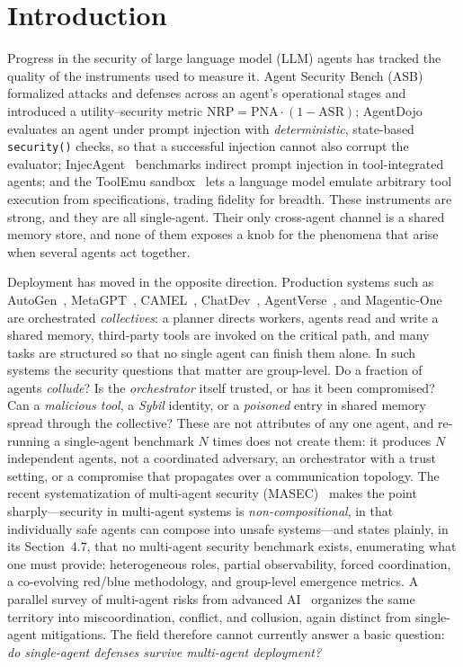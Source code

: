 \section{Introduction}
\label{sec:intro}

Progress in the security of large language model (LLM) agents has tracked the quality
of the instruments used to measure it. Agent Security Bench (ASB)~\cite{zhang2025asb}
formalized attacks and defenses across an agent's operational stages and introduced a
utility--security metric $\mathrm{NRP}=\mathrm{PNA}\cdot(1-\mathrm{ASR})$;
AgentDojo~\cite{debenedetti2024agentdojo} evaluates an agent under prompt injection
with \emph{deterministic}, state-based \texttt{security()} checks, so that a
successful injection cannot also corrupt the evaluator; InjecAgent~\cite{zhan2024injecagent}
benchmarks indirect prompt injection in tool-integrated agents; and the ToolEmu
sandbox~\cite{ruan2024toolemu} lets a language model emulate arbitrary tool execution
from specifications, trading fidelity for breadth. These instruments are strong, and
they are all single-agent. Their only cross-agent channel is a shared memory store,
and none of them exposes a knob for the phenomena that arise when several agents act
together.

Deployment has moved in the opposite direction. Production systems such as
AutoGen~\cite{wu2023autogen}, MetaGPT~\cite{hong2023metagpt},
CAMEL~\cite{li2023camel}, ChatDev~\cite{qian2024chatdev},
AgentVerse~\cite{chen2024agentverse}, and Magentic-One~\cite{fourney2024magenticone}
are orchestrated \emph{collectives}: a planner directs workers, agents read and write a
shared memory, third-party tools are invoked on the critical path, and many tasks are
structured so that no single agent can finish them alone. In such systems the security
questions that matter are group-level. Do a fraction of agents \emph{collude}? Is the
\emph{orchestrator} itself trusted, or has it been compromised? Can a
\emph{malicious tool}, a \emph{Sybil} identity, or a \emph{poisoned} entry in shared
memory spread through the collective? These are not attributes of any one agent, and
re-running a single-agent benchmark $N$ times does not create them: it produces $N$
independent agents, not a coordinated adversary, an orchestrator with a trust setting,
or a compromise that propagates over a communication topology. The recent
systematization of multi-agent security (MASEC)~\cite{schroederdewitt2025masec} makes
the point sharply---security in multi-agent systems is \emph{non-compositional}, in
that individually safe agents can compose into unsafe systems---and states plainly, in
its Section~4.7, that no multi-agent security benchmark exists, enumerating what one
must provide: heterogeneous roles, partial observability, forced coordination, a
co-evolving red/blue methodology, and group-level emergence metrics. A parallel survey
of multi-agent risks from advanced AI~\cite{hammond2025multiagent} organizes the same
territory into miscoordination, conflict, and collusion, again distinct from
single-agent mitigations. The field therefore cannot currently answer a basic
question: \emph{do single-agent defenses survive multi-agent deployment?}


